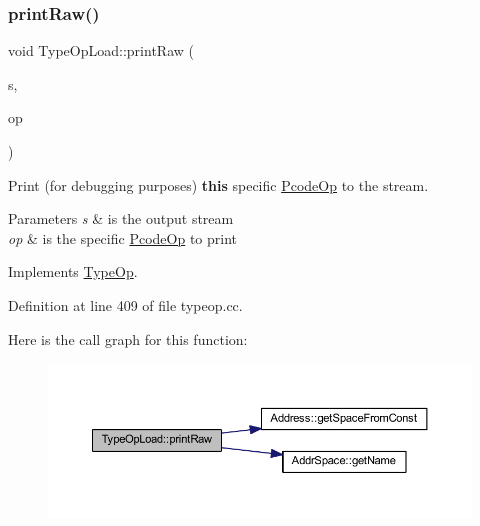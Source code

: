 \subsubsection{\texorpdfstring{printRaw()}{printRaw()}}
{\footnotesize\ttfamily void Type\+Op\+Load\+::print\+Raw (\begin{DoxyParamCaption}\item[{ostream \&}]{s,  }\item[{const \mbox{\hyperlink{class_pcode_op}{Pcode\+Op}} $\ast$}]{op }\end{DoxyParamCaption})\hspace{0.3cm}{\ttfamily [virtual]}}



Print (for debugging purposes) {\bfseries{this}} specific \mbox{\hyperlink{class_pcode_op}{Pcode\+Op}} to the stream. 


\begin{DoxyParams}{Parameters}
{\em s} & is the output stream \\
\hline
{\em op} & is the specific \mbox{\hyperlink{class_pcode_op}{Pcode\+Op}} to print \\
\hline
\end{DoxyParams}


Implements \mbox{\hyperlink{class_type_op_a60717e486917a30cc7cb6e3ce02585e1}{Type\+Op}}.



Definition at line 409 of file typeop.\+cc.

Here is the call graph for this function\+:
\nopagebreak
\begin{figure}[H]
\begin{center}
\leavevmode
\includegraphics[width=350pt]{class_type_op_load_a816c1525151795d00561fdea1d37806c_cgraph}
\end{center}
\end{figure}
\mbox{\label{class_type_op_load_a9352b52888c950ee3a9ca6d50014a23c}} 
